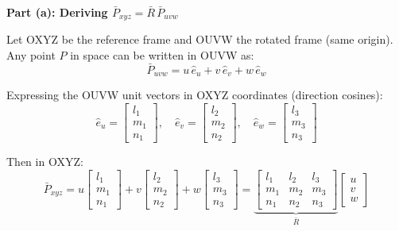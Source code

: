 \documentclass[12pt,a3paper]{article}
\begin{document}
\begin{enumerate}
\begin{tcolorbox}[enhanced,breakable,ansbox,colback=cB!4,colframe=cB,
  boxrule=0.8pt,arc=5pt,
  title={\textbf{Answer}},fonttitle=\bfseries\color{white},
  colbacktitle=cB]

\textbf{Part (a): Deriving $\bar{P}_{xyz} = \bar{R}\,\bar{P}_{uvw}$}

\medskip
Let OXYZ be the reference frame and OUVW the rotated frame (same
origin). Any point $P$ in space can be written in OUVW as:
\[
  \bar{P}_{uvw} = u\,\hat{e}_u + v\,\hat{e}_v + w\,\hat{e}_w
\]

Expressing the OUVW unit vectors in OXYZ coordinates (direction
cosines):
\[
  \hat{e}_u = \begin{bmatrix}l_1\\m_1\\n_1\end{bmatrix},\quad
  \hat{e}_v = \begin{bmatrix}l_2\\m_2\\n_2\end{bmatrix},\quad
  \hat{e}_w = \begin{bmatrix}l_3\\m_3\\n_3\end{bmatrix}
\]

Then in OXYZ:
\[
  \bar{P}_{xyz}
  = u\begin{bmatrix}l_1\\m_1\\n_1\end{bmatrix}
  + v\begin{bmatrix}l_2\\m_2\\n_2\end{bmatrix}
  + w\begin{bmatrix}l_3\\m_3\\n_3\end{bmatrix}
  =
  \underbrace{\begin{bmatrix}l_1&l_2&l_3\\m_1&m_2&m_3\\n_1&n_2&n_3\end{bmatrix}}_{\bar{R}}
  \begin{bmatrix}u\\v\\w\end{bmatrix}
\]


\end{tcolorbox}
\end{enumerate}
\end{document}
